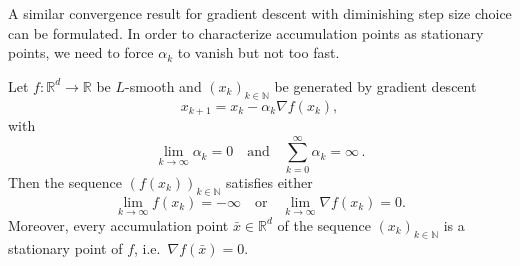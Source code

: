 \documentclass[12pt,openany]{book}
\theoremstyle{definition}
\theoremstyle{definition}
\newcommand{\N}{\mathbb{N}}
\newcommand{\R}{\mathbb{R}}
\begin{document}
A similar convergence result for gradient descent with diminishing step size choice can be formulated. In order to characterize accumulation points as stationary points, we need to force $\alpha_k$ to vanish but not too fast. 
\begin{thm}\label{thm:GD_diminishingstep}
Let $f:\R^d\to\R$ be $L$-smooth and $(x_k)_{k\in\N}$ be generated by gradient descent
\[x_{k+1} = x_k - \alpha_k \nabla f(x_k),\]
with 
\[\lim_{k\to\infty} \alpha_k = 0 \quad \text{and}\quad \sum_{k=0}^\infty \alpha_k = \infty\,. \]
Then the sequence $(f(x_k))_{k\in\N}$ satisfies either
\[\lim_{k\to\infty} f(x_k) = -\infty\quad \text{or}\quad \lim_{k\to\infty} \nabla f(x_k) = 0. \]
Moreover, every accumulation point $\bar x\in\R^d$ of the sequence $(x_k)_{k\in\N}$ is a stationary point of $f$, i.e.~$\nabla f(\bar x)=0$.
\end{thm}
\end{document}
